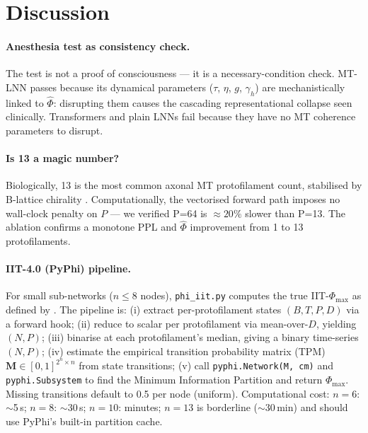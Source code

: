 \documentclass[11pt]{article}
\theoremstyle{definition}
\newcommand{\phihat}{\hat{\Phi}}
\begin{document}
\section{Discussion}
\label{sec:discussion}

\paragraph{Anesthesia test as consistency check.}
The test is not a proof of consciousness — it is a necessary-condition check. MT-LNN passes because its dynamical parameters ($\tau$, $\eta$, $g$, $\gamma_h$) are mechanistically linked to $\phihat$: disrupting them causes the cascading representational collapse seen clinically. Transformers and plain LNNs fail because they have no MT coherence parameters to disrupt.

\paragraph{Is 13 a magic number?}
Biologically, 13 is the most common axonal MT protofilament count, stabilised by B-lattice chirality \citep{hameroff2014consciousness}. Computationally, the vectorised forward path imposes no wall-clock penalty on $P$ — we verified P=64 is $\approx 20\%$ slower than P=13. The ablation confirms a monotone PPL and $\phihat$ improvement from 1 to 13 protofilaments.

\paragraph{IIT-4.0 (PyPhi) pipeline.}
For small sub-networks ($n\le 8$ nodes), \texttt{phi\_iit.py} computes the true IIT-$\Phi_{\max}$ as defined by \citealt{albantakis2023integrated}. The pipeline is: (i) extract per-protofilament states $(B, T, P, D)$ via a forward hook; (ii) reduce to scalar per protofilament via mean-over-$D$, yielding $(N, P)$; (iii) binarise at each protofilament's median, giving a binary time-series $(N, P)$; (iv) estimate the empirical transition probability matrix (TPM) $\mathbf{M}\in[0,1]^{2^n\times n}$ from state transitions; (v) call \texttt{pyphi.Network(M, cm)} and \texttt{pyphi.Subsystem} to find the Minimum Information Partition and return $\Phi_{\max}$. Missing transitions default to 0.5 per node (uniform). Computational cost: $n{=}6$: $\sim$5\,s; $n{=}8$: $\sim$30\,s; $n{=}10$: minutes; $n{=}13$ is borderline ($\sim$30\,min) and should use PyPhi's built-in partition cache.
\end{document}
